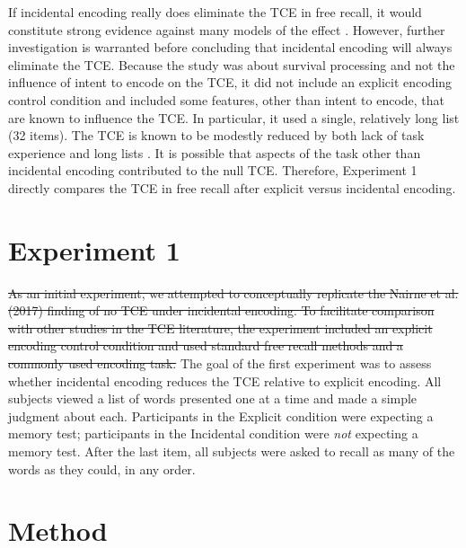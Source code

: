 \documentclass[man,natbib,floatsintext]{apa6} %
\begin{document}
If incidental encoding really does eliminate the TCE in free recall, it would constitute strong evidence against many models of the effect \citep[e.g.,][]{LohnEtal14,HealKaha17}. However, further investigation is warranted before concluding that incidental encoding will always eliminate the TCE. Because the \citet{NairEtal17} study was about survival processing and not the influence of intent to encode on the TCE, it did not include an explicit encoding control condition and included some features, other than intent to encode, that are known to influence the TCE. In particular, it used a single, relatively long list (32 items). The TCE is known to be modestly reduced by both lack of task experience and long lists \citep{HealKaha17}. It is possible that aspects of the task other than incidental encoding contributed to the null TCE. Therefore, Experiment 1 directly compares the TCE in \label{TODO-3} free recall after explicit versus incidental encoding.
\color{black}

\section{Experiment 1}
\st{As an initial experiment, we attempted to conceptually replicate the Nairne et al. (2017) finding of no TCE under incidental encoding. To facilitate comparison with other studies in the TCE literature, the experiment included an explicit encoding control condition and used standard free recall methods and a commonly used encoding task.}
\color{red}
The goal of the first experiment was to assess whether incidental encoding reduces the TCE relative to explicit encoding. All subjects viewed a list of words presented one at a time and made a simple judgment about each. Participants in the Explicit condition were expecting a memory test; participants in the Incidental condition were \emph{not} expecting a memory test.  After the last item, all subjects were asked to recall as many of the words as they could, in any order. 
\color{black}

\section{Method}

\newcommand\listlength{16} %
\newcommand\presrate{4 seconds} %
\newcommand\isi{1 second} %
\newcommand\DFRDelay{16 second} %
\newcommand\recalltime{75 seconds} %
\newcommand\totalss{XX}
\newcommand\totalexcluded{XX}
\end{document}
